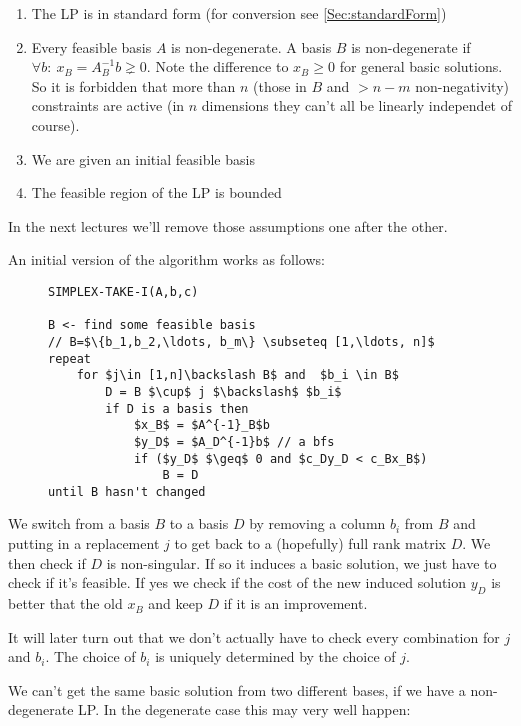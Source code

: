 \begin{enumerate}
\item The LP is in standard form (for conversion see \ref{Sec:standardForm})
\item Every feasible basis $A$ is non-degenerate. A basis $B$ is non-degenerate if $\forall b:\ x_B=A^{-1}_Bb \gneq 0$. Note the difference to $x_B\geq 0$ for general basic solutions. So it is forbidden that more than $n$ (those in $B$ and $>n-m$ non-negativity) constraints are active (in $n$ dimensions they can't all be linearly independet of course). 
\item We are given an initial feasible basis
\item The feasible region of the LP is bounded
\end{enumerate}

In the next lectures we'll remove those assumptions one after the other.

An initial version of the algorithm works as follows:
\begin{figure}[h]
\begin{center}
\begin{lstlisting}
SIMPLEX-TAKE-I(A,b,c)

B <- find some feasible basis
// B=$\{b_1,b_2,\ldots, b_m\} \subseteq [1,\ldots, n]$
repeat 
    for $j\in [1,n]\backslash B$ and  $b_i \in B$
        D = B $\cup$ j $\backslash$ $b_i$
        if D is a basis then
            $x_B$ = $A^{-1}_B$b
            $y_D$ = $A_D^{-1}b$ // a bfs
            if ($y_D$ $\geq$ 0 and $c_Dy_D < c_Bx_B$)
                B = D
until B hasn't changed                
\end{lstlisting}
\end{center}
\end{figure}

We switch from a basis $B$ to a basis $D$ by removing a column $b_i$ from $B$ and putting in a replacement $j$ to get back to a (hopefully) full rank matrix $D$. We then check if $D$ is non-singular. If so it induces a basic solution, we just have to check if it's feasible. If yes we check if the cost of the new induced solution $y_D$ is better that the old $x_B$ and keep $D$ if it is an improvement.

It will later turn out that we don't actually have to check every combination for $j$ and $b_i$. The choice of $b_i$ is uniquely determined by the choice of $j$.

We can't get the same basic solution from two different bases, if we have a non-degenerate LP. In the degenerate case this may very well happen:

